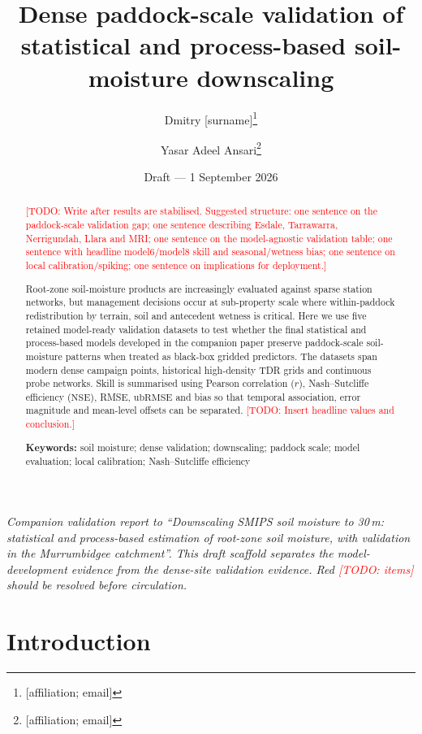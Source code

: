 \documentclass[11pt,a4paper]{article}
\title{Dense paddock-scale validation of statistical and process-based
soil-moisture downscaling}
\author{Dmitry [surname]\thanks{[affiliation; email]} \and
Yasar Adeel Ansari\thanks{[affiliation; email]}}
\date{Draft --- 1 September 2026}
\newcommand{\nse}{\ensuremath{\mathrm{NSE}}}
\newcommand{\ubrmse}{\ensuremath{\mathrm{ubRMSE}}}
\newcommand{\pearsonr}{\ensuremath{r}}
\newcommand{\todo}[1]{\textcolor{red}{[TODO: #1]}}
\begin{document}
\maketitle

\begin{center}
\begin{minipage}{0.9\textwidth}\small\itshape
Companion validation report to ``Downscaling SMIPS soil moisture to 30\,m:
statistical and process-based estimation of root-zone soil moisture, with
validation in the Murrumbidgee catchment''.  This draft scaffold separates the
model-development evidence from the dense-site validation evidence.  Red
\todo{items} should be resolved before circulation.
\end{minipage}
\end{center}

\begin{abstract}
\todo{Write after results are stabilised. Suggested structure: one sentence on
the paddock-scale validation gap; one sentence describing Esdale, Tarrawarra,
Nerrigundah, Llara and MRI; one sentence on the model-agnostic validation table; one sentence with
headline model6/model8 skill and seasonal/wetness bias; one sentence on local
calibration/spiking; one sentence on implications for deployment.}

Root-zone soil-moisture products are increasingly evaluated against sparse
station networks, but management decisions occur at sub-property scale where
within-paddock redistribution by terrain, soil and antecedent wetness is
critical.  Here we use five retained model-ready validation datasets to test
whether the final statistical and process-based models developed in the
companion paper preserve paddock-scale soil-moisture patterns when treated as
black-box gridded predictors.  The datasets span modern dense campaign points,
historical high-density TDR grids and continuous probe networks.  Skill is
summarised using Pearson correlation ($\pearsonr$),
Nash--Sutcliffe efficiency (\nse{}), RMSE, \ubrmse{} and bias so that temporal
association, error magnitude and mean-level offsets can be separated.
\todo{Insert headline values and conclusion.}

\medskip
\noindent\textbf{Keywords:} soil moisture; dense validation; downscaling;
paddock scale; model evaluation; local calibration; Nash--Sutcliffe efficiency
\end{abstract}

\section{Introduction}\label{sec:intro}
\end{document}
